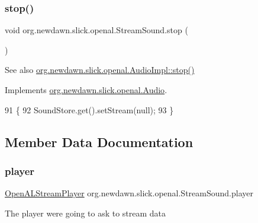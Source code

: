 \subsubsection{\texorpdfstring{stop()}{stop()}}
{\footnotesize\ttfamily void org.\+newdawn.\+slick.\+openal.\+Stream\+Sound.\+stop (\begin{DoxyParamCaption}{ }\end{DoxyParamCaption})\hspace{0.3cm}{\ttfamily [inline]}}

\begin{DoxySeeAlso}{See also}
\mbox{\hyperlink{classorg_1_1newdawn_1_1slick_1_1openal_1_1_audio_impl_a8ad896e19c35a9d3d1d93e52685158ff}{org.\+newdawn.\+slick.\+openal.\+Audio\+Impl\+::stop()}} 
\end{DoxySeeAlso}


Implements \mbox{\hyperlink{interfaceorg_1_1newdawn_1_1slick_1_1openal_1_1_audio_a8346ca83b84cb6605efb695462f12337}{org.\+newdawn.\+slick.\+openal.\+Audio}}.


\begin{DoxyCode}
91                        \{
92         SoundStore.get().setStream(null);
93     \}
\end{DoxyCode}


\subsection{Member Data Documentation}
\mbox{\label{classorg_1_1newdawn_1_1slick_1_1openal_1_1_stream_sound_a5e4d0d6e22af804ce94996f6ab90872f}} 
\subsubsection{\texorpdfstring{player}{player}}
{\footnotesize\ttfamily \mbox{\hyperlink{classorg_1_1newdawn_1_1slick_1_1openal_1_1_open_a_l_stream_player}{Open\+A\+L\+Stream\+Player}} org.\+newdawn.\+slick.\+openal.\+Stream\+Sound.\+player\hspace{0.3cm}{\ttfamily [private]}}

The player we\textquotesingle{}re going to ask to stream data 
